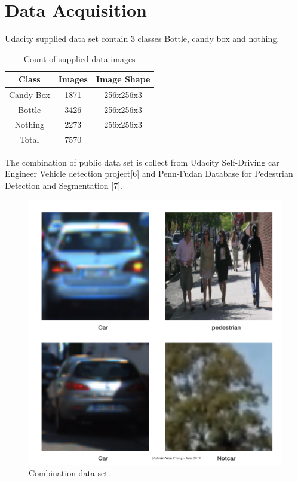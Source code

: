 \documentclass[10pt,journal,compsoc]{IEEEtran}
\begin{document}
\section{Data Acquisition}
Udacity supplied data set contain 3 classes Bottle, candy box and nothing.
\begin{table}[h]
 \begin{center}
      \begin{tabular}{ |c|c|c| } 
       \hline
       Class & Images & Image Shape \\
       \hline
       Candy Box & 1871 & 256x256x3 \\ 
       Bottle & 3426 & 256x256x3 \\ 
       Nothing & 2273 & 256x256x3 \\
       \hline
       Total & 7570 & \\
       \hline
      \end{tabular}
      \caption{Count of supplied data images}
      \label{table:1}
      \end{center}
      \end{table}
The combination of public data set is collect from Udacity Self-Driving car Engineer Vehicle detection project[6] and Penn-Fudan Database for Pedestrian Detection and Segmentation [7].
\begin{figure}[thpb]
      \centering
      \includegraphics[width=\linewidth]{mixDataset.png}
      \caption{Combination data set.}
      \label{fig:robot1}
\end{figure}
\end{document}
